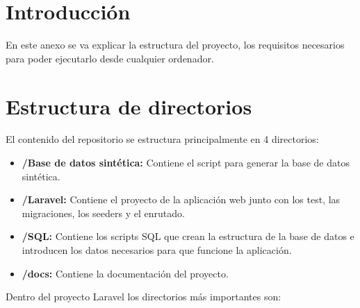 
\section{Introducción}

En este anexo se va explicar la estructura del proyecto, los requisitos necesarios para poder ejecutarlo desde cualquier ordenador.  

\section{Estructura de directorios}

El contenido del repositorio se estructura principalmente en 4 directorios:

\begin{itemize}
    \item \textbf{/Base de datos sintética:} Contiene el script para generar la base de datos sintética.
    \item \textbf{/Laravel:} Contiene el proyecto de la aplicación web junto con los test, las migraciones, los seeders y el enrutado.
    \item \textbf{/SQL:} Contiene los scripts SQL que crean la estructura de la base de datos e introducen los datos necesarios para que funcione la aplicación.
    \item \textbf{/docs:} Contiene la documentación del proyecto. 
\end{itemize}

Dentro del proyecto Laravel los directorios más importantes son:

